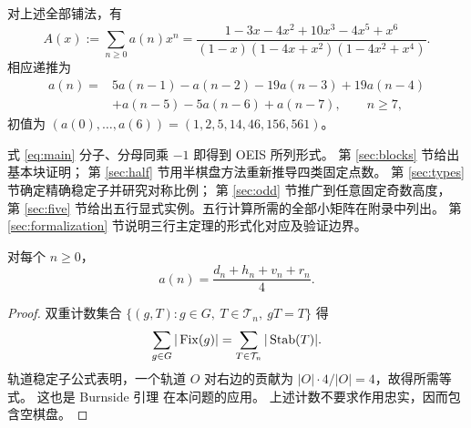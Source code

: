 \begin{theorem}[三行对称轨道的生成函数]\label{thm:main}
对上述全部铺法，有
\begin{equation}\label{eq:main}
 A(x):=\sum_{n\ge0}a(n)x^n
 =\frac{1-3x-4x^2+10x^3-4x^5+x^6}
 {(1-x)(1-4x+x^2)(1-4x^2+x^4)}.
\end{equation}
相应递推为
\begin{equation}\label{eq:recurrence}
\begin{split}
a(n)={}&5a(n-1)-a(n-2)-19a(n-3)+19a(n-4)\\
       &+a(n-5)-5a(n-6)+a(n-7),\qquad n\ge7,
\end{split}
\end{equation}
初值为 $(a(0),\ldots,a(6))=(1,2,5,14,46,156,561)$。
\end{theorem}

式 \eqref{eq:main} 分子、分母同乘 $-1$ 即得到 OEIS 所列形式。
第 \ref{sec:blocks} 节给出基本块证明；
第 \ref{sec:half} 节用半棋盘方法重新推导四类固定点数。
第 \ref{sec:types} 节确定精确稳定子并研究对称比例；
第 \ref{sec:odd} 节推广到任意固定奇数高度，
第 \ref{sec:five} 节给出五行显式实例。五行计算所需的全部小矩阵在附录中列出。
第 \ref{sec:formalization} 节说明三行主定理的形式化对应及验证边界。

\begin{lemma}[轨道平均公式]\label{lem:burnside}
对每个 $n\ge0$，
\begin{equation}\label{eq:burnside}
 a(n)=\frac{d_n+h_n+v_n+r_n}{4}.
\end{equation}
\end{lemma}
\begin{proof}
双重计数集合 $\{(g,T):g\in G,\ T\in\mathcal T_n,\ gT=T\}$ 得
\[
 \sum_{g\in G}|\operatorname{Fix}(g)|=\sum_{T\in\mathcal T_n}|\operatorname{Stab}(T)|.
\]
轨道稳定子公式表明，一个轨道 $O$ 对右边的贡献为
$|O|\cdot4/|O|=4$，故得所需等式。
这也是 Burnside 引理 \cite[第 7 章，Lemma 7.2]{stanley} 在本问题的应用。
上述计数不要求作用忠实，因而包含空棋盘。
\end{proof}
